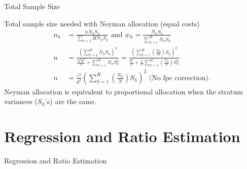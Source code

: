\documentclass[10pt]{beamer}\usepackage[]{graphicx}\usepackage[]{xcolor}
\begin{document}
\begin{frame}{Total Sample Size}
{\begin{block}{Total sample size needed with Neyman allocation (equal costs)}
\begin{align*}
n_h &=\frac{nN_hS_h}{\sum_{h=1}{H} N_hS_h} \textrm{ and } w_h = \frac{N_hS_h}{\sum_{h=1}^{H} N_hS_h} \\
n &= \frac{\left(\sum_{h=1}^H N_hS_h\right)^2}{\frac{N^2d^2}{z^2}+\sum_{h=1}^H N_h S_h^2} = 
\frac{\left(\sum_{h=1}^H \left(\frac{N_h}{N}\right)S_h\right)^2}{\frac{d^2}{z^2}+\frac{1}{N}\sum_{h=1}^H \left( \frac{N_h}{N}\right) S_h^2} \\
n &= \frac{z^2}{d^2}\left( \sum_{h=1}^H \left(\frac{N_h}{N} \right) S_h\right)^2 \textrm{ (No fpc correction)}.
\end{align*}
Neyman allocation is equivalent to proportional allocation when the stratum variances ($S_h$'s) are the same.
\end{block}
}

\end{frame}

\section{Regression and Ratio Estimation}

\begin{frame}{}
\begin{block}{}
\begin{center}
Regression and Ratio Estimation
\end{center}
\end{block}
\end{frame}
\end{document}
